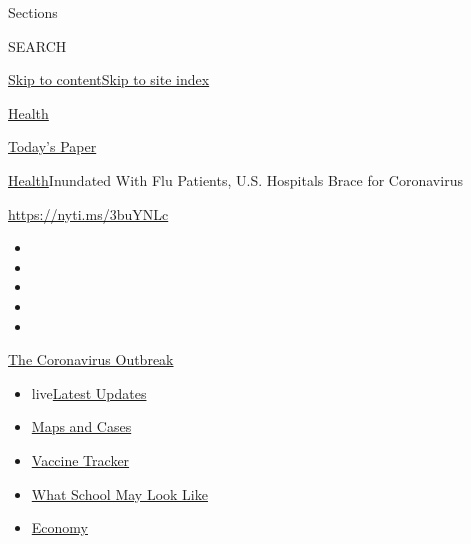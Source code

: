 Sections

SEARCH

\protect\hyperlink{site-content}{Skip to
content}\protect\hyperlink{site-index}{Skip to site index}

\href{https://www.nytimes.com/section/health}{Health}

\href{https://myaccount.nytimes.com/auth/login?response_type=cookie\&client_id=vi}{}

\href{https://www.nytimes.com/section/todayspaper}{Today's Paper}

\href{/section/health}{Health}\textbar{}Inundated With Flu Patients,
U.S. Hospitals Brace for Coronavirus

\url{https://nyti.ms/3buYNLc}

\begin{itemize}
\item
\item
\item
\item
\item
\end{itemize}

\href{https://www.nytimes.com/news-event/coronavirus?action=click\&pgtype=Article\&state=default\&region=TOP_BANNER\&context=storylines_menu}{The
Coronavirus Outbreak}

\begin{itemize}
\tightlist
\item
  live\href{https://www.nytimes.com/2020/08/02/world/coronavirus-updates.html?action=click\&pgtype=Article\&state=default\&region=TOP_BANNER\&context=storylines_menu}{Latest
  Updates}
\item
  \href{https://www.nytimes.com/interactive/2020/us/coronavirus-us-cases.html?action=click\&pgtype=Article\&state=default\&region=TOP_BANNER\&context=storylines_menu}{Maps
  and Cases}
\item
  \href{https://www.nytimes.com/interactive/2020/science/coronavirus-vaccine-tracker.html?action=click\&pgtype=Article\&state=default\&region=TOP_BANNER\&context=storylines_menu}{Vaccine
  Tracker}
\item
  \href{https://www.nytimes.com/interactive/2020/07/29/us/schools-reopening-coronavirus.html?action=click\&pgtype=Article\&state=default\&region=TOP_BANNER\&context=storylines_menu}{What
  School May Look Like}
\item
  \href{https://www.nytimes.com/live/2020/07/31/business/stock-market-today-coronavirus?action=click\&pgtype=Article\&state=default\&region=TOP_BANNER\&context=storylines_menu}{Economy}
\end{itemize}


